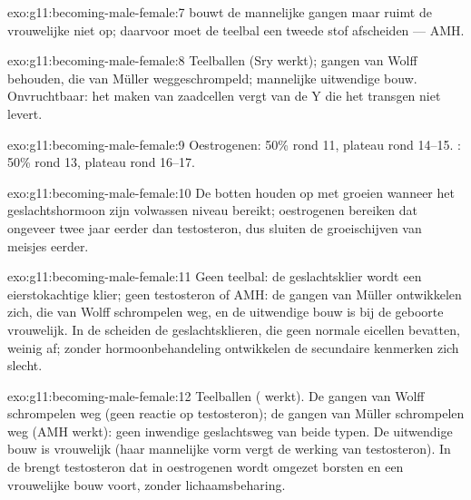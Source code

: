 \begin{solution}{exo:g11:becoming-male-female:7}
 bouwt de mannelijke gangen maar ruimt de vrouwelijke niet op;
daarvoor moet de teelbal een tweede stof afscheiden --- AMH.
\end{solution}

\begin{solution}{exo:g11:becoming-male-female:8}
Teelballen (Sry werkt); gangen van Wolff behouden, die van Müller
weggeschrompeld; mannelijke uitwendige bouw. Onvruchtbaar: het maken van
zaadcellen vergt  van de Y die het transgen niet levert.
\end{solution}

\begin{solution}{exo:g11:becoming-male-female:9}
Oestrogenen: 50\% rond 11, plateau rond 14--15. : 50\% rond 13,
plateau rond 16--17.
\end{solution}

\begin{solution}{exo:g11:becoming-male-female:10}
De botten houden op met groeien wanneer het geslachtshormoon zijn
volwassen niveau bereikt; oestrogenen bereiken dat ongeveer twee jaar
eerder dan testosteron, dus sluiten de groeischijven van meisjes eerder.
\end{solution}

\begin{solution}{exo:g11:becoming-male-female:11}
Geen teelbal: de geslachtsklier wordt een eierstokachtige klier; geen
testosteron of AMH: de gangen van Müller ontwikkelen zich, die van Wolff
schrompelen weg, en de uitwendige bouw is bij de geboorte vrouwelijk. In
de  scheiden de geslachtsklieren, die geen normale eicellen
bevatten, weinig af; zonder hormoonbehandeling ontwikkelen de secundaire
kenmerken zich slecht.
\end{solution}

\begin{solution}{exo:g11:becoming-male-female:12}
Teelballen ( werkt). De gangen van Wolff schrompelen weg (geen reactie
op testosteron); de gangen van Müller schrompelen weg (AMH werkt): geen
inwendige geslachtsweg van beide typen. De uitwendige bouw is
vrouwelijk (haar mannelijke vorm vergt de werking van testosteron). In de
 brengt testosteron dat in oestrogenen wordt omgezet borsten en
een vrouwelijke bouw voort, zonder lichaamsbeharing.
\end{solution}


